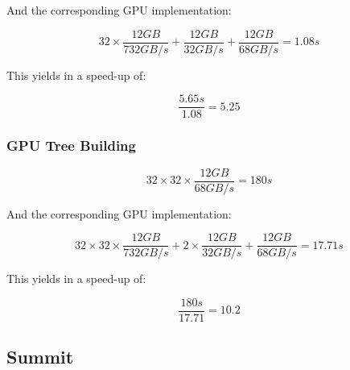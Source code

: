 \documentclass[]{article}
\begin{document}
And the corresponding GPU implementation:
\begin{center}
	\begin{equation}
		32 \times \frac{12 GB}{732 GB/s} + \frac{12 GB}{32 GB/s}  + \frac{12 GB}{68 GB/s} = 1.08s
	\end{equation}
\end{center}



This yields in a speed-up of:
\begin{center}
	\begin{equation}
		\frac{5.65s}{1.08} = 5.25
	\end{equation}
\end{center}


\subsubsection{GPU Tree Building}

\begin{center}
	\begin{equation}
		32 \times 32 \times \frac{ 12 GB }{68 GB/s} = 180s
	\end{equation}
\end{center}

And the corresponding GPU implementation:
\begin{center}
	\begin{equation}
		32 \times 32 \times \frac{12 GB}{732 GB/s} + 2 \times \frac{12 GB}{32 GB/s}  + \frac{12 GB}{68 GB/s} = 17.71s
	\end{equation}
\end{center}

This yields in a speed-up of:
\begin{center}
	\begin{equation}
		\frac{180s}{17.71} = 10.2
	\end{equation}
\end{center}

\vspace{5mm}


\subsection{Summit}
\end{document}
